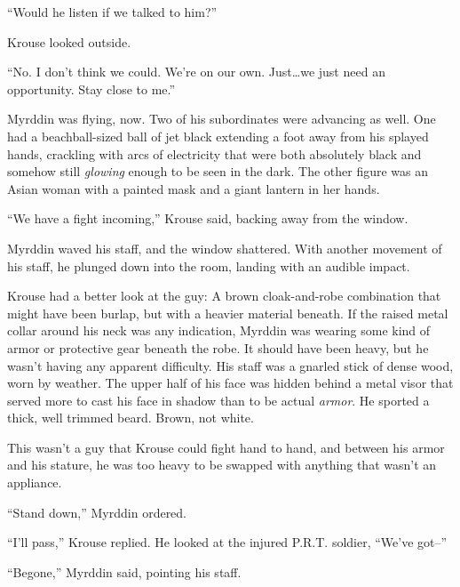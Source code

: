 ``Would he listen if we talked to him?''



Krouse looked outside.



``No.  I don't think we could.  We're on our own.  Just\ldots we just need an opportunity.  Stay close to me.''



Myrddin was flying, now.  Two of his subordinates were advancing as well.  One had a beachball-sized ball of jet black extending a foot away from his splayed hands, crackling with arcs of electricity that were both absolutely black and somehow still \emph{glowing }enough to be seen in the dark.  The other figure was an Asian woman with a painted mask and a giant lantern in her hands.



``We have a fight incoming,'' Krouse said, backing away from the window.



Myrddin waved his staff, and the window shattered.  With another movement of his staff, he plunged down into the room, landing with an audible impact.



Krouse had a better look at the guy:  A brown cloak-and-robe combination that might have been burlap, but with a heavier material beneath.  If the raised metal collar around his neck was any indication, Myrddin was wearing some kind of armor or protective gear beneath the robe.  It should have been heavy, but he wasn't having any apparent difficulty.  His staff was a gnarled stick of dense wood, worn by weather.  The upper half of his face was hidden behind a metal visor that served more to cast his face in shadow than to be actual \emph{armor}.  He sported a thick, well trimmed beard.  Brown, not white.



This wasn't a guy that Krouse could fight hand to hand, and between his armor and his stature, he was too heavy to be swapped with anything that wasn't an appliance.



``Stand down,'' Myrddin ordered.



``I'll pass,'' Krouse replied.  He looked at the injured P.R.T. soldier, ``We've got--''



``Begone,'' Myrddin said, pointing his staff.



